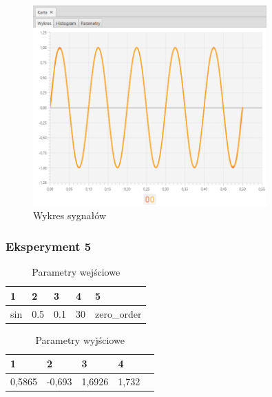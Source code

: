 \documentclass[12pt]{article}
\begin{document}
{{{                \begin{figure}[H]
                    \centering
                    \includegraphics[width=0.8\textwidth]{img/result/experiment1/04/data_draw_original_chart_recon_output_130204.png}
                    \caption{Wykres sygnałów}
                \end{figure}
            }
            \newpage

            \subsubsection{Eksperyment 5} {
                \begin{table}[H]
                    \centering
                    \begin{tabular}{|l|l|l|l|l|}
                        \hline
                        1 & 2 & 3 & 4 & 5   \\ \hline
                        sin & 0.5 & 0.1 & 30 & zero\_order   \\ \hline
                    \end{tabular}
                    \caption{Parametry wejściowe}
                \end{table}

                \begin{table}[H]
                    \centering
                    \begin{tabular}{|l|l|l|l|l|}
                        \hline
                        1 & 2 & 3 & 4   \\ \hline
                        0,5865 & -0,693 & 1,6926 & 1,732   \\ \hline
                    \end{tabular}
                    \caption{Parametry wyjściowe}
                \end{table}


}}}
\end{document}
